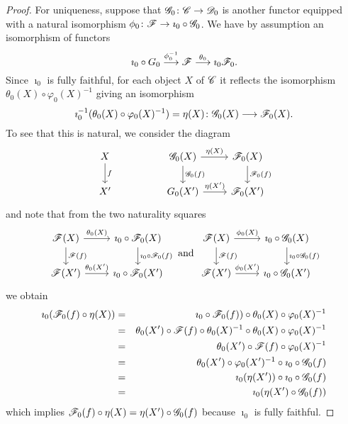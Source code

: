 \documentclass[10pt]{amsart}
\begin{document}
\begin{lem}
\begin{proof}
    For uniqueness, suppose that $\mathscr{G}_0 \colon \mathscr{C} \to \mathscr{D}_0$ is another functor equipped with a natural isomorphism $\phi_0 \colon \mathscr{F} \to \imath_0 \circ \mathscr{G}_0$.
    We have by assumption an isomorphism of functors
    $$\imath_0 \circ G_0 \overset{\phi_0^{-1}}\longrightarrow \mathscr{F} \overset{\theta_0}\longrightarrow \imath_0 \mathscr{F}_0.$$
    Since $\imath_0$ is fully faithful, for each object $X$ of $\mathscr{C}$ it reflects the isomorphism $\theta_0(X) \circ \varphi_0(X)^{-1}$ giving an isomorphism 
    $$\imath_0^{-1}(\theta_0(X) \circ \varphi_0(X)^{-1}) = \eta(X) \colon \mathscr{G}_0(X) \longrightarrow \mathscr{F}_0(X).$$
    To see that this is natural, we consider the diagram
    $$\begin{tikzcd}
      X\arrow{d}{f} & & \G_0(X) \arrow{d}{\G_0(f)}\arrow{r}{\eta(X)} & \F_0(X)\arrow{d}{\F_0(f)}\\
      X^\prime & & G_0(X^\prime) \arrow{r}{\eta(X^\prime)} & \F_0(X^\prime)
    \end{tikzcd}$$
    and note that from the two naturality squares
    $$\begin{tikzcd}
      \F(X) \arrow{d}{\F(f)}\arrow{r}{\theta_0(X)} & \imath_0 \circ \F_0(X)\arrow{d}{\imath_0 \circ \F_0(f)}\\
      \F(X^\prime) \arrow{r}{\theta_0(X^\prime)} & \imath_0 \circ \F_0(X^\prime)
    \end{tikzcd}
    \ \text{and}\ 
    \begin{tikzcd}
      \F(X) \arrow{d}{\F(f)}\arrow{r}{\phi_0(X)} & \imath_0 \circ \G_0(X)\arrow{d}{\imath_0 \circ \G_0(f)}\\
      \F(X^\prime) \arrow{r}{\phi_0(X^\prime)} & \imath_0 \circ \G_0(X^\prime)
    \end{tikzcd}$$
    we obtain
    \begin{eqnarray*}
      \imath_0(\mathscr{F}_0(f) \circ \eta(X)) &=& \imath_0 \circ \mathscr{F}_0(f)) \circ \theta_0(X) \circ \varphi_0(X)^{-1}\\
      &=& \theta_0(X^\prime) \circ \mathscr{F}(f) \circ \theta_0(X)^{-1} \circ \theta_0(X) \circ \varphi_0(X)^{-1}\\
      &=& \theta_0(X^\prime) \circ \mathscr{F}(f) \circ \varphi_0(X)^{-1}\\
      &=& \theta_0(X^\prime) \circ \varphi_0(X^\prime)^{-1} \circ \imath_0 \circ \mathscr{G}_0(f)\\
      &=& \imath_0(\eta(X^\prime)) \circ \imath_0 \circ \mathscr{G}_0(f)\\
      &=& \imath_0(\eta(X^\prime) \circ \mathscr{G}_0(f))
    \end{eqnarray*}
    which implies $\mathscr{F}_0(f) \circ \eta(X) = \eta(X^\prime) \circ \mathscr{G}_0(f)$ because $\imath_0$ is fully faithful.
  \end{proof}
\end{lem}
\end{document}
